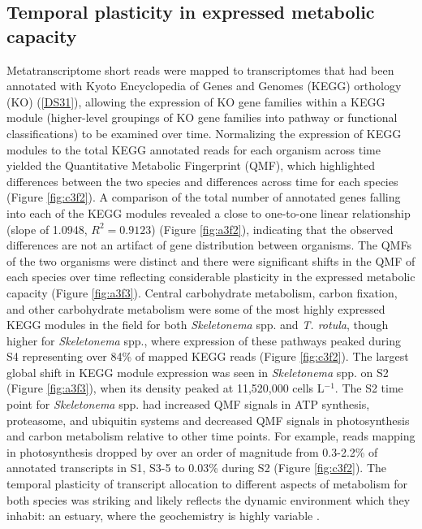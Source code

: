 \subsection{Temporal plasticity in expressed metabolic capacity} 
Metatranscriptome short reads were mapped to transcriptomes that had been annotated with Kyoto Encyclopedia of Genes and Genomes (KEGG) orthology (KO) (\ref{DS31}), allowing the expression of KO gene families within a KEGG module (higher-level groupings of KO gene families into pathway or functional classifications) to be examined over time. Normalizing the expression of KEGG modules to the total KEGG annotated reads for each organism across time yielded the Quantitative Metabolic Fingerprint (QMF), which highlighted differences between the two species and differences across time for each species (Figure \ref{fig:c3f2}). A comparison of the total number of annotated genes falling into each of the KEGG modules revealed a close to one-to-one linear relationship (slope of 1.0948, $R^{2}=0.9123$) (Figure \ref{fig:a3f2}), indicating that the observed differences are not an artifact of gene distribution between organisms. The QMFs of the two organisms were distinct and there were significant shifts in the QMF of each species over time reflecting considerable plasticity in the expressed metabolic capacity (Figure \ref{fig:a3f3}). Central carbohydrate metabolism, carbon fixation, and other carbohydrate metabolism were some of the most highly expressed KEGG modules in the field for both \textit{Skeletonema} spp. and \textit{T. rotula}, though higher for \textit{Skeletonema} spp., where expression of these pathways peaked during S4 representing over 84\% of mapped KEGG reads (Figure \ref{fig:c3f2}). The largest global shift in KEGG module expression was seen in \textit{Skeletonema} spp. on S2 (Figure \ref{fig:a3f3}), when its density peaked at 11,520,000 cells L$^{-1}$. The S2 time point for \textit{Skeletonema} spp. had increased QMF signals in ATP synthesis, proteasome, and ubiquitin systems and decreased QMF signals in photosynthesis and carbon metabolism relative to other time points. For example, reads mapping in photosynthesis dropped by over an order of magnitude from 0.3-2.2\% of annotated transcripts in S1, S3-5 to 0.03\% during S2 (Figure \ref{fig:c3f2}). The temporal plasticity of transcript allocation to different aspects of metabolism for both species was striking and likely reflects the dynamic environment which they inhabit: an estuary, where the geochemistry is highly variable \citep{Nixon1995}.\par
